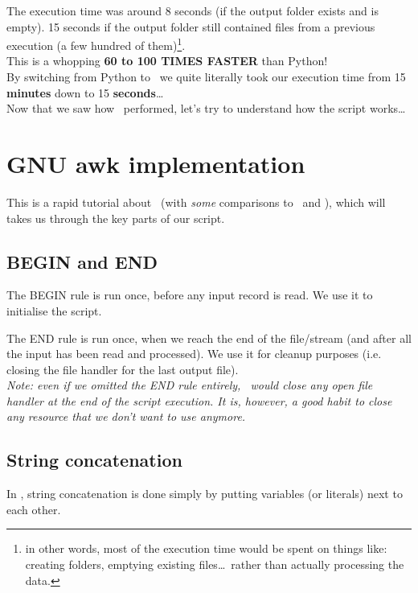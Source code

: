 The execution time was around 8 seconds (if the output folder exists and is empty). 15 seconds if the output folder still contained files from a previous execution (a few hundred of them)\footnote{in other words, most of the execution time would be spent on things like: creating folders, emptying existing files\dots\ rather than actually processing the data.}. \\



This is a whopping \textbf{60 to 100 TIMES FASTER} than Python! \\

By switching from Python to \gawk\ we quite literally took our execution time from 15 \textbf{minutes} down to 15 \textbf{seconds}\dots \\


Now that we saw how \awk\ performed, let's try to understand how the script works\dots 


\section*{GNU awk implementation}

This is a rapid tutorial about \gawk\ (with \emph{some} comparisons to \python\ and \perl), which will takes us through the key parts of our script.

\subsection*{BEGIN and END}

The BEGIN rule is run once, before any input record is read.
We use it to initialise the script.

The END rule is run once, when we reach the end of the file/stream (and after all the input has been read and processed).
We use it for cleanup purposes (i.e. closing the file handler for the last output file). \\ 

\emph{Note: even if we omitted the END rule entirely, \gawk\ would close any open file handler at the end of the script execution. It is, however, a good habit to close any resource that we don't want to use anymore.}


\subsection*{String concatenation}

In \awk, string concatenation is done simply by putting variables (or literals) next to each other. \\

